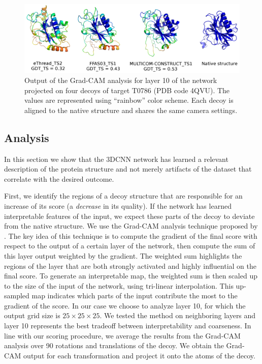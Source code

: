 \documentclass{bioinfo}
\begin{document}
\begin{figure}[!t]
    \centerline{\includegraphics[width=0.8\linewidth]{image7.png}}
    \vspace{-10pt}
    \caption{Output of the Grad-CAM analysis for layer 10 of the
      network projected on four decoys of target T0786 (PDB code 4QVU).
      The values are represented using ``rainbow'' color scheme. 
      Each decoy is aligned to the native structure and shares the same camera settings.}
    \label{Fig:GradCAMT0786_more}
\end{figure}


\subsection{Analysis}

In this section we show that the 3DCNN network has learned a relevant
description of the protein structure and not merely artifacts of the
dataset that correlate with the desired outcome.

First, we identify the regions of a decoy structure that are
responsible for an increase of its score (a \emph{decrease} in its
quality). If the network has learned interpretable features of the
input, we expect these parts of the decoy to deviate from the native
structure.
%
We use the Grad-CAM analysis technique proposed by \citealp{selvaraju2016grad}. 
The key idea of this technique is to
compute the gradient of the final score with respect to the output of
a certain layer of the network, then compute the sum of this layer
output weighted by the gradient.
%
The weighted sum highlights the regions of the layer that are both
strongly activated and highly influential on the final score. To
generate an interpretable map, the weighted sum is then scaled up to
the size of the input of the network, using tri-linear interpolation.
%
This up-sampled map indicates which parts of the input contribute
the most to the gradient of the score.  In our case we choose to
analyze layer 10, for which the output grid size is $25\times 25\times
25$.  We tested the method on neighboring layers and
layer 10 represents the best tradeoff between interpretability and
coarseness.
%
In line with our scoring procedure, we average the results
from the Grad-CAM analysis over 90 rotations and translations of the
decoy. We obtain the Grad-CAM output for each transformation and
project it onto the atoms of the decoy.  
\end{document}
